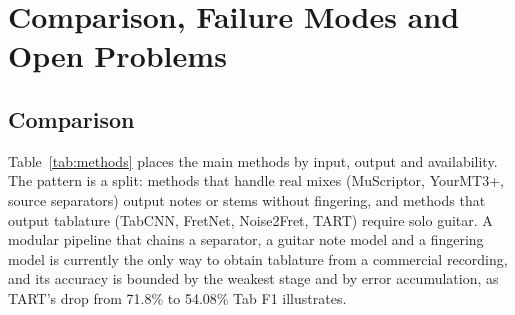 \section{Comparison, Failure Modes and Open Problems}
\label{sec:comparison}

\subsection{Comparison}
Table~\ref{tab:methods} places the main methods by input, output and
availability. The pattern is a split: methods that handle real mixes
(MuScriptor, YourMT3+, source separators) output notes or stems without
fingering, and methods that output tablature (TabCNN, FretNet, Noise2Fret,
TART) require solo guitar. A modular pipeline that chains a separator, a
guitar note model and a fingering model is currently the only way to obtain
tablature from a commercial recording, and its accuracy is bounded by the
weakest stage and by error accumulation, as TART's drop from 71.8\% to
54.08\% Tab F1 illustrates.

